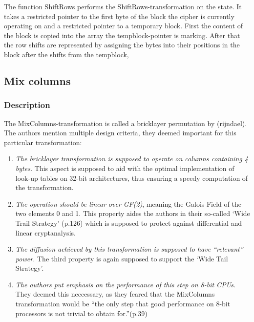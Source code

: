 The function ShiftRows performs the ShiftRows-transformation on the
state. It takes a restricted pointer to the first byte of the block the
cipher is currently operating on and a restricted pointer to a temporary
block. First the content of the block is copied into the array the
tempblock-pointer is marking. After that the row shifts are represented
by assigning the bytes into their positions in the block after the
shifts from the tempblock,

\hypertarget{mix-columns}{%
\subsection{Mix columns}\label{mix-columns}}

\hypertarget{description-4}{%
\subsubsection{Description}\label{description-4}}

The MixColumns-transformation is called a bricklayer permutation by
(rijndael). The authors
mention multiple design criteria, they deemed important for this
particular transformation:

\begin{enumerate}
\def\labelenumi{\arabic{enumi}.}

\item
  \emph{The bricklayer transformation is supposed to operate on columns
  containing 4 bytes.} This aspect is supposed to aid with the optimal
  implementation of look-up tables on 32-bit architectures, thus
  ensuring a speedy computation of the transformation.
\item
  \emph{The operation should be linear over GF(2)}, meaning the Galois
  Field of the two elements 0 and 1. This property aides the authors in
  their so-called `Wide Trail Strategy' (p.126) which is supposed to
  protect against differential and linear cryptanalysis.
\item
  \emph{The diffusion achieved by this transformation is supposed to
  have ``relevant'' power.} The third property is again supposed to
  support the `Wide Tail Strategy'.
\item
  \emph{The authors put emphasis on the performance of this step on 8-bit
  CPUs.} They deemed this neccessary, as they feared that the MixColumns
  transformation would be ``the only step that good performance on 8-bit
  processors is not trivial to obtain for.''(p.39)
\end{enumerate}


